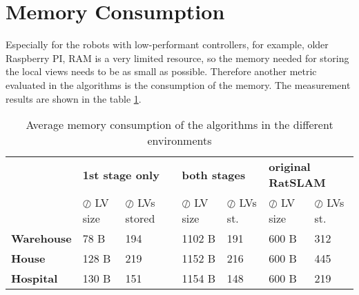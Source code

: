 \section{Memory Consumption}\label{section:memoryConsumption}

Especially for the robots with low-performant controllers, for example, older Raspberry PI, RAM is a very limited resource, so the memory needed for storing the local views needs to be as small as possible. Therefore another metric evaluated in the algorithms is the consumption of the memory. The measurement results are shown in the table \ref{tab:memory}.\par

\begin{table}[htpb]
    \caption{Average memory consumption of the algorithms in the different environments}\label{tab:memory}
    \centering
    \begin{tabular}{l | l  l| l l| l l}
        \toprule
        \textbf{}          & \multicolumn{2}{l|}{\textbf{1st stage only}} & \multicolumn{2}{l|}{\textbf{both stages}} & \multicolumn{2}{l}{\textbf{original RatSLAM}}                                                             \\
        {}                 & $\oslash$ LV size                            & $\oslash$ LVs stored                      & $\oslash$ LV size                             & $\oslash$ LVs st. & $\oslash$ LV size & $\oslash$ LVs st. \\
        \hline
        \textbf{Warehouse} & 78 B                                         & 194                                       & 1102 B                                        & 191               & 600 B             & 312               \\
        \textbf{House}     & 128 B                                        & 219                                       & 1152 B                                        & 216               & 600 B             & 445               \\
        \textbf{Hospital}  & 130 B                                        & 151                                       & 1154 B                                        & 148               & 600 B             & 219               \\
        \bottomrule
    \end{tabular}
\end{table}


